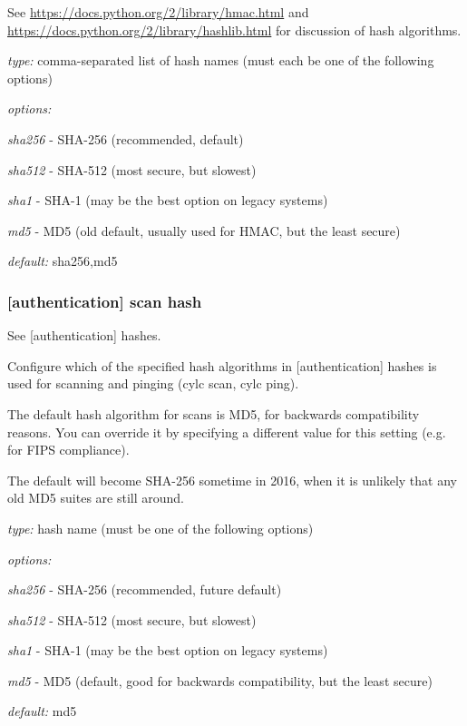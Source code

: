See \url{https://docs.python.org/2/library/hmac.html} and
\url{https://docs.python.org/2/library/hashlib.html} for discussion of hash
algorithms.

\begin{myitemize}
\item {\em type:} comma-separated list of hash names (must each be one of the
    following options)
\item {\em options:}
    \begin{myitemize}
        \item {\em sha256} - SHA-256 (recommended, default)
        \item {\em sha512} - SHA-512 (most secure, but slowest)
        \item {\em sha1} - SHA-1 (may be the best option on legacy systems)
        \item {\em md5} - MD5 (old default, usually used for HMAC, but the
            least secure)
    \end{myitemize}
\item {\em default:} sha256,md5
\end{myitemize}


\subsubsection{[authentication] \textrightarrow scan hash}

See [authentication] \textrightarrow hashes.

Configure which of the specified hash algorithms in [authentication]
\textrightarrow hashes is used for scanning and pinging (cylc scan, cylc ping).

The default hash algorithm for scans is MD5, for backwards compatibility
reasons. You can override it by specifying a different value for this setting
(e.g. for FIPS compliance).

The default will become SHA-256 sometime in 2016, when it is unlikely that any
old MD5 suites are still around.

\begin{myitemize}
\item {\em type:} hash name (must be one of the following options)
\item {\em options:}
    \begin{myitemize}
        \item {\em sha256} - SHA-256 (recommended, future default)
        \item {\em sha512} - SHA-512 (most secure, but slowest)
        \item {\em sha1} - SHA-1 (may be the best option on legacy systems)
        \item {\em md5} - MD5 (default, good for backwards compatibility, but
            the least secure)
    \end{myitemize}
\item {\em default:} md5
\end{myitemize}

